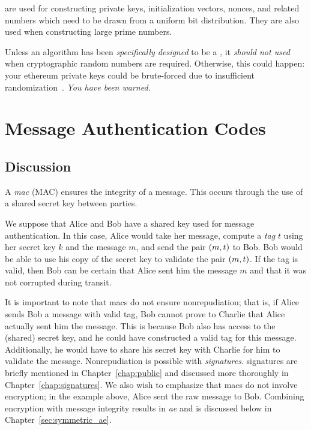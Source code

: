  are used for constructing private keys,
\glspl{initialization vector}, \glspl{nonce},
and related numbers which need to be drawn from a uniform bit distribution.
They are also used when constructing large prime numbers.

Unless an algorithm has been \emph{specifically designed} to be a
,
it \emph{should not used} when cryptographic random numbers are required.
Otherwise, this could happen:
your \gls{ethereum} private keys could be brute-forced due to
insufficient randomization~\cite{ProfanityBreak}.
\emph{You have been warned.}






\section{Message Authentication Codes}
\label{sec:symmetric_mac}

\subsection{Discussion}

A \emph{\gls{mac}} (MAC) ensures the integrity
of a message.
This occurs through the use of a shared secret key between parties.

We suppose that Alice and Bob have a shared key used for
message authentication.
In this case, Alice would take her message,
compute a \emph{tag} $t$ using her secret key $k$ and the message $m$,
and send the pair $\left( m,t \right)$ to Bob.
Bob would be able to use his copy of the secret key to validate
the pair $\left( m,t \right)$.
If the tag is valid, then Bob can be certain that Alice sent him
the message $m$ and that it was not corrupted during transit.

It is important to note that \glspl{mac} do not ensure nonrepudiation;
that is, if Alice sends Bob a message with valid tag,
Bob cannot prove to Charlie that Alice actually sent him the message.
This is because Bob also has access to the (shared) secret key,
and he could have constructed a valid tag for this message.
Additionally, he would have to share his secret key with Charlie
for him to validate the message.
Nonrepudiation is possible with \emph{\glspl{signature}}.
\Glspl{signature} are briefly mentioned in Chapter~\ref{chap:public}
and discussed more thoroughly in Chapter~\ref{chap:signatures}.
We also wish to emphasize that \glspl{mac} do not involve encryption;
in the example above, Alice sent the raw message to Bob.
Combining encryption with message integrity results in
\emph{\gls{ae}} and is discussed
below in Chapter~\ref{sec:symmetric_ae}.

